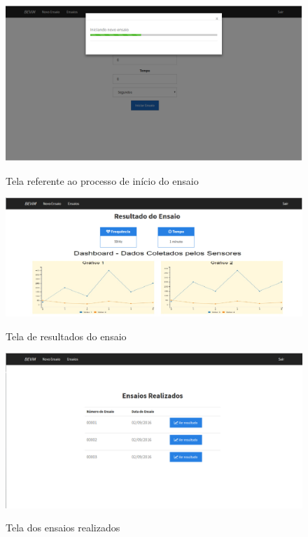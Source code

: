 \begin{figure}[H]
\centering
\includegraphics[keepaspectratio=true,scale=0.55]	{figuras/tela_iniciando.png}
\label{fig:tela_iniciando}
\caption{Tela referente ao processo de início do ensaio}
\end{figure}

\begin{figure}[H]
\centering
\includegraphics[keepaspectratio=true,scale=0.52]	{figuras/tela_resultado_ensaio.png}
\label{fig:tela_resultado_ensaio}
\caption{Tela de resultados do ensaio}
\end{figure}

\begin{figure}[H]
\centering
\includegraphics[keepaspectratio=true,scale=0.40]{figuras/tela_ensaios.png}
\label{fig:tela_ensaios}
\caption{Tela dos ensaios realizados}
\end{figure}

